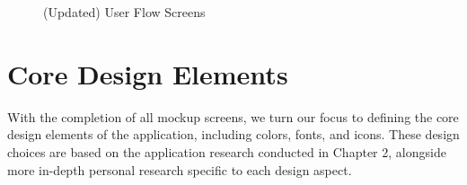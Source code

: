 \begin{figure}[htbp]\ContinuedFloat
    \centering
    \hfill
    \caption{(Updated) User Flow Screens}
    \label{fig:updated_user_flow_screens}
\end{figure}
\FloatBarrier

\section{Core Design Elements}

With the completion of all mockup screens, we turn our focus to defining the core design elements of the application, including colors, fonts, and icons. These design choices are based on the application research conducted in Chapter 2, alongside more in-depth personal research specific to each design aspect.

